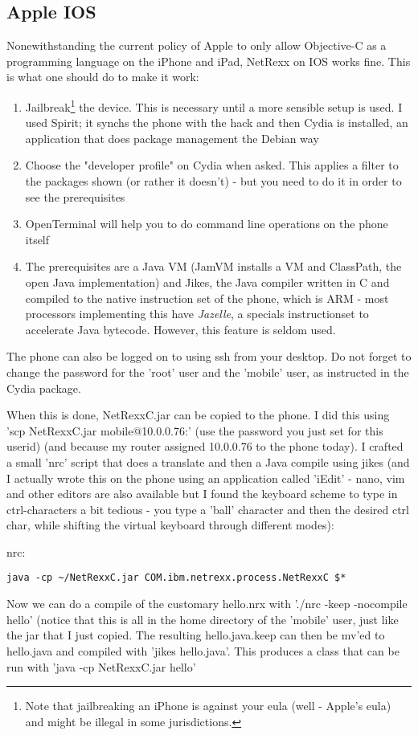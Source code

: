 {\subsection{Apple IOS}
Nonewithstanding the current policy of Apple to only allow Objective-C
as a programming language on the iPhone and iPad, NetRexx on IOS works fine. This is what one should do to make it work:
\begin{enumerate}
\item Jailbreak\footnote{Note that jailbreaking an iPhone is against your eula (well - Apple's eula) and might be illegal in some jurisdictions.} the device. This is necessary until a more sensible setup is used. I used Spirit; it synchs the phone with the hack and then Cydia is installed, an application that does package management the Debian way
\item Choose the "developer profile" on Cydia when asked. This applies a filter to the packages shown (or rather it doesn't) - but you need to do it in order to see the prerequisites
\item OpenTerminal will help you to do command line operations on the phone itself
\item The prerequisites are a Java VM (JamVM installs a VM and
  ClassPath, the open Java implementation) and Jikes, the Java
  compiler written in C and compiled to the native instruction set of
  the phone, which is ARM - most processors implementing this have
  \emph{Jazelle}, a specials instructionset to accelerate Java
  bytecode. However, this feature is seldom used. 
\end{enumerate}
The phone can also be logged on to using ssh from your desktop. Do not forget to change the password for the 'root' user and the 'mobile' user, as instructed in the Cydia package.

When this is done, NetRexxC.jar can be copied to the phone. I did this using 'scp NetRexxC.jar mobile@10.0.0.76:' (use the password you just set for this userid) (and because my router assigned 10.0.0.76 to the phone today). I crafted a small 'nrc' script that does a translate and then a Java compile using jikes (and I actually wrote this on the phone using an application called 'iEdit' - nano, vim and other editors are also available but I found the keyboard scheme to type in ctrl-characters a bit tedious - you type a 'ball' character and then the desired ctrl char, while shifting the virtual keyboard through different modes):

nrc:
\begin{verbatim}
java -cp ~/NetRexxC.jar COM.ibm.netrexx.process.NetRexxC $*
\end{verbatim}
Now we can do a compile of the customary hello.nrx with './nrc -keep -nocompile hello' (notice that this is all in the home directory of the 'mobile' user, just like the jar that I just copied. The resulting hello.java.keep can then be mv'ed to hello.java and compiled with 'jikes hello.java'. This produces a class that can be run with 'java -cp NetRexxC.jar hello'
}
